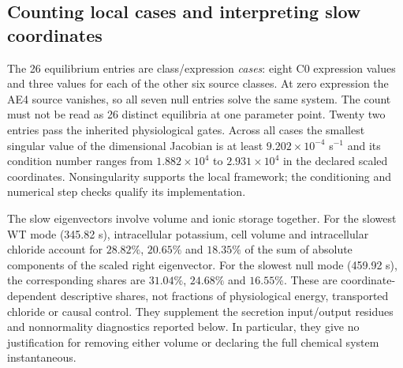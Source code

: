 \subsection{Counting local cases and interpreting slow coordinates}
The 26 equilibrium entries are class/expression \emph{cases}: eight C0
expression values and three values for each of the other six source classes.
At zero expression the AE4 source vanishes, so all seven null entries solve
the same system. The count must not be read as 26 distinct equilibria at one
parameter point. Twenty two entries pass the inherited physiological gates.
Across all cases the smallest singular value of the dimensional Jacobian is
at least $9.202\times10^{-4}$ s$^{-1}$ and its condition number ranges from
$1.882\times10^4$ to $2.931\times10^4$ in the declared scaled coordinates.
Nonsingularity supports the local framework; the conditioning and numerical
step checks qualify its implementation.

The slow eigenvectors involve volume and ionic storage together. For the
slowest WT mode (345.82 s), intracellular potassium, cell volume and
intracellular chloride account for $28.82\%$, $20.65\%$ and $18.35\%$ of
the sum of absolute components of the scaled right eigenvector. For the
slowest null mode (459.92 s), the corresponding shares are $31.04\%$,
$24.68\%$ and $16.55\%$. These are coordinate-dependent descriptive shares,
not fractions of physiological energy, transported chloride or causal
control. They supplement the secretion input/output residues and
nonnormality diagnostics reported below. In particular, they give no
justification for removing either volume or declaring the full chemical
system instantaneous.



